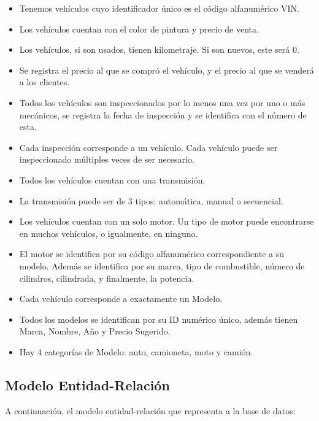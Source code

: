 \documentclass[12pt]{article}
\begin{document}
\begin{itemize}
\item Tenemos vehículos cuyo identificador único es el código alfanumérico VIN.
\item Los vehículos cuentan con el color de pintura y precio de venta.
\item Los vehículos, si son usados, tienen kilometraje. Si son nuevos, este será 0.
\item Se registra el precio al que se compró el vehículo, y el precio al que se venderá a los clientes.

\item Todos los vehículos son inspeccionados por lo menos una vez por uno o más mecánicos, se registra la fecha de inspección y se identifica con el número de esta.
\item Cada inspección corresponde a un vehículo. Cada vehículo puede ser inspeccionado múltiples veces de ser necesario.

\item Todos los vehículos cuentan con una transmisión.
\item La transmisión puede ser de 3 tipos: automática, manual o secuencial.

\item Los vehículos cuentan con un solo motor. Un tipo de motor puede encontrarse en muchos vehículos, o igualmente, en ninguno.
\item El motor se identifica por su código alfanumérico correspondiente a su modelo. Además se identifica por su marca, tipo de combustible, número de cilindros, cilindrada, y finalmente, la potencia.

\item Cada vehículo corresponde a exactamente un Modelo.
\item Todos los modelos se identifican por su ID numérico único, además tienen Marca, Nombre, Año y Precio Sugerido.
\item Hay 4 categorías de Modelo: auto, camioneta, moto y camión.
\end{itemize}

\subsection{Modelo Entidad-Relaci\'on}

A continuación, el modelo entidad-relación que representa a la base de datos:
\end{document}
